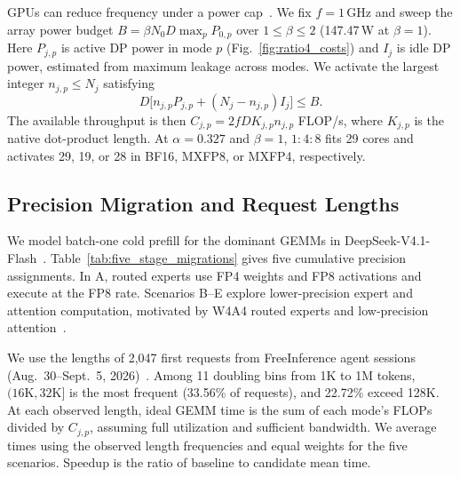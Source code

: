 \documentclass[conference,10pt,letterpaper]{IEEEtran}
\begin{document}
GPUs can reduce frequency under a power cap~\cite{nvidia2024nvmlpower}. We fix $f=1$\,GHz and sweep the array power budget $B=\beta N_0D\max_p P_{0,p}$ over $1\le\beta\le2$ (147.47\,W at $\beta=1$). Here $P_{j,p}$ is active DP power in mode $p$ (Fig.~\ref{fig:ratio4_costs}) and $I_j$ is idle DP power, estimated from maximum leakage across modes. We activate the largest integer $n_{j,p}\le N_j$ satisfying
\begin{equation}
D\big[n_{j,p}P_{j,p}+(N_j-n_{j,p})I_j\big]\le B .
\label{eq:active_core_budget}
\end{equation}
The available throughput is then $C_{j,p}=2fD K_{j,p}n_{j,p}$ FLOP/s, where $K_{j,p}$ is the native dot-product length. At $\alpha=0.327$ and $\beta=1$, $1:4:8$ fits 29 cores and activates 29, 19, or 28 in BF16, MXFP8, or MXFP4, respectively.

\subsection{Precision Migration and Request Lengths}
We model batch-one cold prefill for the dominant GEMMs in DeepSeek-V4.1-Flash~\cite{deepseekv41source}. Table~\ref{tab:five_stage_migrations} gives five cumulative precision assignments. In A, routed experts use FP4 weights and FP8 activations and execute at the FP8 rate. Scenarios B--E explore lower-precision expert and attention computation, motivated by W4A4 routed experts and low-precision attention~\cite{nvidiav41routed2026,flashattention3,sageattention3}.


We use the lengths of 2,047 first requests from FreeInference agent sessions (Aug.~30--Sept.~5, 2026)~\cite{nixon2026requests}. Among 11 doubling bins from 1K to 1M tokens, $(16\mathrm{K},32\mathrm{K}]$ is the most frequent (33.56\% of requests), and 22.72\% exceed 128K. At each observed length, ideal GEMM time is the sum of each mode's FLOPs divided by $C_{j,p}$, assuming full utilization and sufficient bandwidth. We average times using the observed length frequencies and equal weights for the five scenarios. Speedup is the ratio of baseline to candidate mean time.
\end{document}
